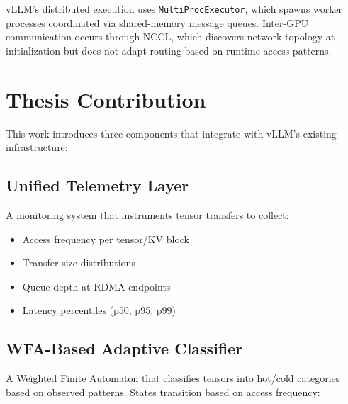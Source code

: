 \documentclass[10pt,letterpaper]{article}
\begin{document}
vLLM's distributed execution uses \texttt{MultiProcExecutor}, which spawns worker processes coordinated via shared-memory message queues. Inter-GPU communication occurs through NCCL, which discovers network topology at initialization but does not adapt routing based on runtime access patterns.

\section{Thesis Contribution}

This work introduces three components that integrate with vLLM's existing infrastructure:

\subsection{Unified Telemetry Layer}
A monitoring system that instruments tensor transfers to collect:
\begin{itemize}[noitemsep]
    \item Access frequency per tensor/KV block
    \item Transfer size distributions
    \item Queue depth at RDMA endpoints
    \item Latency percentiles (p50, p95, p99)
\end{itemize}

\subsection{WFA-Based Adaptive Classifier}
A Weighted Finite Automaton that classifies tensors into hot/cold categories based on observed patterns. States transition based on access frequency:

\begin{center}
\end{center}
\end{document}
